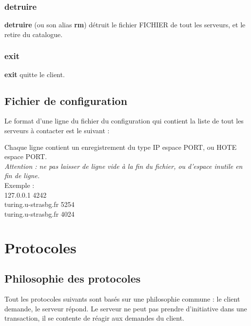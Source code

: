 \documentclass[10pt,a4paper]{article}
\begin{document}
\subsubsection{detruire}
\begin{center}
\end{center}
\textbf{detruire} (ou son alias \textbf{rm}) détruit le fichier FICHIER de tout les serveurs, et le retire du catalogue.

\subsubsection{exit}
\begin{center}
\end{center}
\textbf{exit} quitte le client.

\subsection{Fichier de configuration}

Le format d'une ligne du fichier du configuration qui contient la liste de tout les serveurs à contacter est le suivant :
\begin{center}
\end{center}
Chaque ligne contient un enregistrement du type IP espace PORT, ou HOTE espace PORT.\\
\textit{Attention : ne pas laisser de ligne vide à la fin du fichier, ou d'espace inutile en fin de ligne.}\\

Exemple :\\
127.0.0.1 4242\\
turing.u-strasbg.fr 5254\\
turing.u-strasbg.fr 4024\\
\newpage

\section{Protocoles}

\subsection{Philosophie des protocoles}
Tout les protocoles suivants sont basés sur une philosophie commune : le client demande, le serveur répond.
Le serveur ne peut pas prendre d'initiative dans une transaction, il se contente de réagir aux demandes du client.
\end{document}
